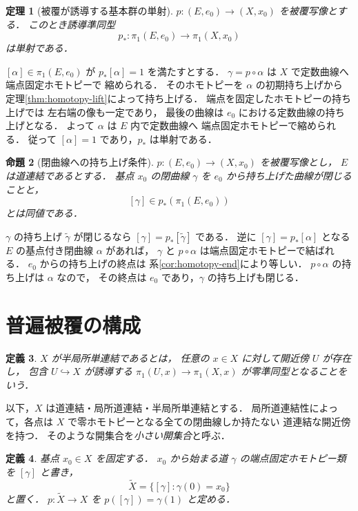 \documentclass[a5paper,10pt,onecolumn]{jsarticle}
\makeatletter
\theoremstyle{mathnotetheorem}
\newtheorem{theorem}{定理}[section]
\newtheorem{definition}[theorem]{定義}
\newtheorem{proposition}[theorem]{命題}
\renewcommand{\proofname}{証明}
\renewenvironment{proof}[1][\proofname]{%
  \par\pushQED{\qed}\normalfont\topsep4\p@\@plus2\p@\relax
  \trivlist\item[\hskip\labelsep\bfseries #1]\ignorespaces
}{\popQED\endtrivlist\@endpefalse}
\makeatother
\begin{document}
\begin{theorem}[被覆が誘導する基本群の単射]
\label{thm:pi1-inj}
$p:(E,e_0)\to(X,x_0)$ を被覆写像とする．
このとき誘導準同型
\[
 p_*:\pi_1(E,e_0)\to\pi_1(X,x_0)
\]
は単射である．
\end{theorem}
\begin{proof}
$[\alpha]\in\pi_1(E,e_0)$ が $p_*[\alpha]=1$ を満たすとする．
$\gamma=p\circ\alpha$ は $X$ で定数曲線へ端点固定ホモトピーで
縮められる．
そのホモトピーを $\alpha$ の初期持ち上げから
定理\ref{thm:homotopy-lift}によって持ち上げる．
端点を固定したホモトピーの持ち上げでは
左右端の像も一定であり，
最後の曲線は $e_0$ における定数曲線の持ち上げとなる．
よって $\alpha$ は $E$ 内で定数曲線へ
端点固定ホモトピーで縮められる．
従って $[\alpha]=1$ であり，$p_*$ は単射である．
\end{proof}

\begin{proposition}[閉曲線への持ち上げ条件]\label{prop:loop-lift}
$p:(E,e_0)\to(X,x_0)$ を被覆写像とし，
$E$ は道連結であるとする．
基点 $x_0$ の閉曲線 $\gamma$ を
$e_0$ から持ち上げた曲線が閉じることと，
\[
 [\gamma]\in p_*(\pi_1(E,e_0))
\]
とは同値である．
\end{proposition}
\begin{proof}
$\gamma$ の持ち上げ $\widetilde\gamma$ が閉じるなら
$[\gamma]=p_*[\widetilde\gamma]$ である．
逆に $[\gamma]=p_*[\alpha]$ となる
$E$ の基点付き閉曲線 $\alpha$ があれば，
$\gamma$ と $p\circ\alpha$ は端点固定ホモトピーで結ばれる．
$e_0$ からの持ち上げの終点は
系\ref{cor:homotopy-end}により等しい．
$p\circ\alpha$ の持ち上げは $\alpha$ なので，
その終点は $e_0$ であり，$\gamma$ の持ち上げも閉じる．
\end{proof}

\section{普遍被覆の構成}

\begin{definition}
$X$ が\emph{半局所単連結}であるとは，
任意の $x\in X$ に対して開近傍 $U$ が存在し，
包含 $U\hookrightarrow X$ が誘導する
$\pi_1(U,x)\to\pi_1(X,x)$ が零準同型となることをいう．
\end{definition}

以下，$X$ は道連結・局所道連結・半局所単連結とする．
局所道連結性によって，各点は
$X$ で零ホモトピーとなる全ての閉曲線しか持たない
道連結な開近傍を持つ．
そのような開集合を\emph{小さい開集合}と呼ぶ．

\begin{definition}
基点 $x_0\in X$ を固定する．
$x_0$ から始まる道 $\gamma$ の端点固定ホモトピー類を
$[\gamma]$ と書き，
\[
 \widetilde X=
 \{[\gamma]:\gamma(0)=x_0\}
\]
と置く．
$p:\widetilde X\to X$ を
$p([\gamma])=\gamma(1)$ と定める．
\end{definition}
\end{document}
